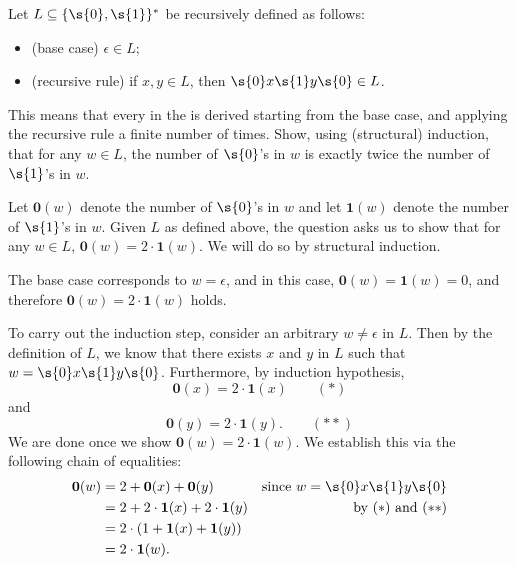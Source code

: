 \begin{flex}
\begin{exercise} \label{exercise:Structural-induction-on-words}
Let  $L \subseteq \{\s{0},\s{1}\}^*$ be recursively defined as follows:
\begin{itemize}
    \item (base case) $\epsilon \in L$;
    \item (recursive rule) if $x, y \in L$, then $\s{0}x\s{1}y\s{0} \in L$.
\end{itemize}
This means that every  in the  is derived starting from the base case, and applying the recursive rule a finite number of times. 
Show, using (structural) induction, that for any  $w \in L$, the number of $\s{0}$'s in $w$ is exactly twice the number of $\s{1}$'s in $w$.
\end{exercise}

\begin{solution}
Let $\mathbf{0}(w)$ denote the number of $\s{0}$'s in $w$ and let $\mathbf{1}(w)$ denote the number of $\s{1}$'s in $w$. Given $L$ as defined above, the question asks us to show that for any $w \in L$, $\mathbf{0}(w) = 2 \cdot \mathbf{1}(w)$. We will do so by structural induction.

The base case corresponds to $w = \epsilon$, and in this case, $\mathbf{0}(w) = \mathbf{1}(w) = 0$, and therefore $\mathbf{0}(w) = 2 \cdot \mathbf{1}(w)$ holds.

To carry out the induction step, consider an arbitrary  $w \neq \epsilon$ in $L$. Then by the definition of $L$, we know that there exists $x$ and $y$ in $L$ such that $w = \s{0}x\s{1}y\s{0}$. Furthermore, by induction hypothesis, 
\begin{equation*} %
    \mathbf{0}(x) = 2 \cdot \mathbf{1}(x) \quad \quad (*)
\end{equation*}
and 
\begin{equation*} %
    \mathbf{0}(y) = 2 \cdot \mathbf{1}(y). \quad \quad (**)
\end{equation*}
We are done once we show $\mathbf{0}(w) = 2 \cdot \mathbf{1}(w)$. We establish this via the following chain of equalities: 
\begin{align*}
    \mathbf{0}(w) & = 2 + \mathbf{0}(x) + \mathbf{0}(y) & \text{since $w = \s{0}x\s{1}y\s{0}$} \\
    & = 2 + 2 \cdot \mathbf{1}(x) + 2 \cdot \mathbf{1}(y) & \text{by $(*)$ and $(**)$}\\
    & = 2 \cdot (1 + \mathbf{1}(x) + \mathbf{1}(y)) \\
    & = 2 \cdot \mathbf{1}(w).
\end{align*}


\end{solution}
\end{flex}
